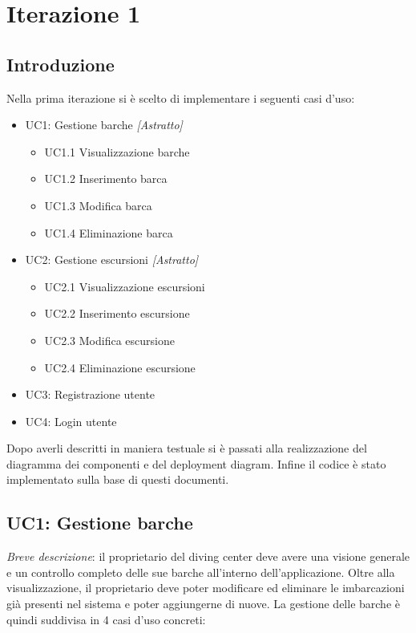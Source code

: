 \section{Iterazione 1}

\subsection{Introduzione}
Nella prima iterazione si è scelto di implementare i seguenti casi d'uso:

\begin{itemize}
    \item UC1: Gestione barche \textit{[Astratto]}
          \begin{itemize}
              \item UC1.1 Visualizzazione barche
              \item UC1.2 Inserimento barca
              \item UC1.3 Modifica barca
              \item UC1.4 Eliminazione barca
          \end{itemize}
    \item UC2: Gestione escursioni \textit{[Astratto]}
          \begin{itemize}
              \item UC2.1 Visualizzazione escursioni
              \item UC2.2 Inserimento escursione
              \item UC2.3 Modifica escursione
              \item UC2.4 Eliminazione escursione
          \end{itemize}
    \item UC3: Registrazione utente
    \item UC4: Login utente
\end{itemize}
Dopo averli descritti in maniera testuale si è passati alla realizzazione del diagramma dei componenti e del deployment diagram.
Infine il codice è stato implementato sulla base di questi documenti.

\subsection{UC1: Gestione barche}

\emph{Breve descrizione}: il proprietario del diving center deve avere una visione generale e un controllo completo delle sue barche all'interno dell'applicazione.
Oltre alla visualizzazione, il proprietario deve poter modificare ed eliminare le imbarcazioni già presenti nel sistema e poter aggiungerne di nuove.
La gestione delle barche è quindi suddivisa in 4 casi d'uso concreti:

